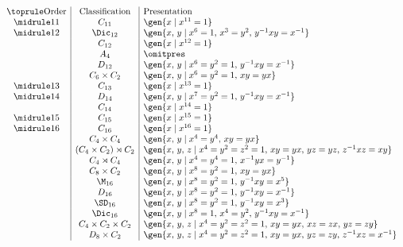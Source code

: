 \begin{displaymath}
\begin{array}{c|c|l}
\toprule
\text{Order} & \text{Classification} & \text{Presentation} \\
\midrule
11 & C_{11} & \gen{x \mid x^{11} = 1} \\
\midrule
12 & \Dic_{12} & \gen{x,\,y \mid x^6 = 1,\, x^3 = y^2,\, y^{-1}xy = x^{-1}} \\
   & C_{12} & \gen{x \mid x^{12} = 1} \\
   & A_4 & {\omitpres} \\ %
   & D_{12} & \gen{x,\,y \mid x^6 = y^2 = 1,\, y^{-1}xy = x^{-1}} \\
   & C_6 \times C_2 & \gen{x,\,y \mid x^6 = y^2 = 1,\, xy = yx} \\
\midrule
13 & C_{13} & \gen{x \mid x^{13} = 1} \\
\midrule
14 & D_{14} & \gen{x,\,y \mid x^7 = y^2 = 1,\, y^{-1}xy = x^{-1}} \\
   & C_{14} & \gen{x \mid x^{14} = 1} \\
\midrule
15 & C_{15} & \gen{x \mid x^{15} = 1} \\
\midrule
16 & C_{16} & \gen{x \mid x^{16} = 1} \\
   & C_4 \times C_4 & \gen{x,\,y \mid x^4 = y^4,\, xy = yx} \\
   & (C_4 \times C_2) \rtimes C_2 & \gen{x,\,y,\,z \mid x^4 = y^2 = z^2 = 1,\, xy = yx,\, yz = yz,\, z^{-1}xz = xy} \\
   & C_4 \rtimes C_4 & \gen{x,\,y \mid x^4 = y^4 = 1,\, x^{-1}yx = y^{-1}} \\
   & C_8 \times C_2 & \gen{x,\,y \mid x^8 = y^2 = 1,\, xy = yx} \\
   & \M_{16} & \gen{x,\,y \mid x^8 = y^2 = 1,\, y^{-1}xy = x^{5}} \\
   & D_{16} & \gen{x,\,y \mid x^8 = y^2 = 1,\, y^{-1}xy = x^{-1}} \\
   & \SD_{16} & \gen{x,\,y \mid x^8 = y^2 = 1,\, y^{-1}xy = x^3} \\
   & \Dic_{16} & \gen{x,\,y \mid x^8 = 1,\, x^4 = y^2,\, y^{-1}xy = x^{-1}} \\
   & C_4 \times C_2 \times C_2 & \gen{x,\,y,\,z \mid x^4 = y^2 = z^2 = 1,\, xy = yx,\, xz = zx,\, yz = zy} \\
   & D_8 \times C_2 & \gen{x,\,y,\,z \mid x^4 = y^2 = z^2 = 1,\, xy = yx,\, yz = zy,\, z^{-1}xz = x^{-1}} \\

\end{array}
\end{displaymath}
